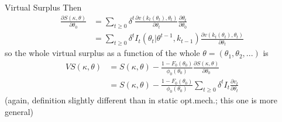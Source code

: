 \documentclass[english,10pt
,aspectratio=169
]{beamer}
\begin{document}
\begin{frame}{Virtual Surplus}
Then
\begin{align*}
	\frac{\partial S(\kappa,\theta)}{\partial \theta_0} &= \sum_{t\geq 0} \delta^t \frac{\partial v(k_t(\theta_t),\theta_t)}{\partial \theta_t} \frac{\partial \theta_t}{\partial \theta_0}
	\\
	&= \sum_{t\geq 0} \delta^t I_t(\theta_t | \theta^{t-1}, k_{t-1}) \frac{\partial v(k_t(\theta_t),\theta_t)}{\partial \theta_t}
\end{align*}
so the whole virtual surplus as a function of the whole $\theta=(\theta_1,\theta_2,...)$ is
\begin{align*}
	VS(\kappa,\theta) &= S(\kappa,\theta) - \frac{1-F_0(\theta_0)}{\phi_0(\theta_0)} \frac{\partial S(\kappa,\theta)}{\partial \theta_0}
	\\
	&= S(\kappa,\theta) - \frac{1-F_0(\theta_0)}{\phi_0(\theta_0)} \sum_{t\geq 0} \delta^t I_t \frac{\partial v_t}{\partial \theta_t}
\end{align*}
(again, definition slightly different than in static opt.mech.; this one is more general)
\end{frame}
\end{document}
